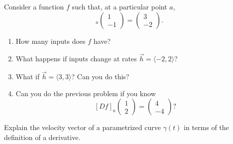 \documentclass[12pt]{amsart}
\begin{document}
\begin{question}
    Consider a function $f$ such that, at a particular point $a$,
    \begin{equation*}
        [Df]_a\begin{pmatrix}
            1 \\ -1
        \end{pmatrix}
        = \begin{pmatrix}
            3 \\ -2
        \end{pmatrix}.
    \end{equation*}
    \begin{enumerate}
        \item How many inputs does $f$ have?
        \item What happens if inputs change at rates $\vec{h} = \langle -2, 2 \rangle$?
        \item What if $\vec{h} = \langle 3, 3 \rangle$? Can you do this?
        \item Can you do the previous problem if you know 
            $$[Df]_a \begin{pmatrix}
                1 \\2 
            \end{pmatrix}
            = 
            \begin{pmatrix}
                4 \\ -4
            \end{pmatrix}?
            $$
    \end{enumerate}
\end{question}

\begin{question}
    Explain the velocity vector of a parametrized curve $\gamma(t)$ in terms of the definition 
    of a derivative.
\end{question}
\end{document}
